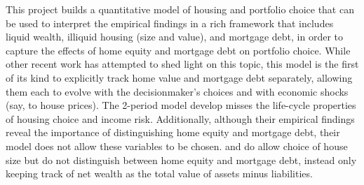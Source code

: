   This project builds a quantitative model of housing and portfolio choice that can be used to interpret the empirical findings \cite{Chetty2017} in a rich framework that includes liquid wealth, illiquid housing (size and value), and mortgage debt, in order to capture the effects of home equity and mortgage debt on portfolio choice. While other recent work has attempted to shed light on this topic, this model is the first of its kind to explicitly track home value and mortgage debt separately, allowing them each to evolve with the decisionmaker's choices and with economic shocks (say, to house prices). The 2-period model \cite{Chetty2017} develop misses the life-cycle properties of housing choice and income risk. Additionally, although their empirical findings reveal the importance of distinguishing home equity and mortgage debt, their model does not allow these variables to be chosen. \cite{Cocco2004rfs} and \cite{yao2005optimal} do allow choice of house size but do not distinguish between home equity and mortgage debt, instead only keeping track of net wealth as the total value of assets minus liabilities.

